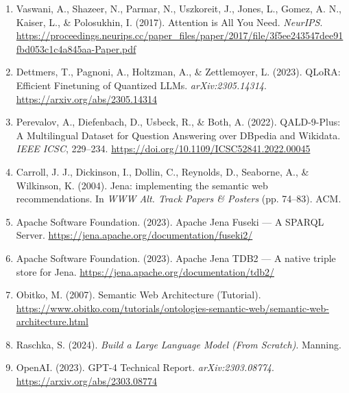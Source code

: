 \documentclass[12pt,a4paper,onecolumn]{article}
\begin{document}
\begin{enumerate}
  \item Vaswani, A., Shazeer, N., Parmar, N., Uszkoreit, J., Jones, L., Gomez, A. N., Kaiser, L., \& Polosukhin, I. (2017). Attention is All You Need. \textit{NeurIPS}. \url{https://proceedings.neurips.cc/paper_files/paper/2017/file/3f5ee243547dee91fbd053c1c4a845aa-Paper.pdf}
  \item Dettmers, T., Pagnoni, A., Holtzman, A., \& Zettlemoyer, L. (2023). QLoRA: Efficient Finetuning of Quantized LLMs. \textit{arXiv:2305.14314}. \url{https://arxiv.org/abs/2305.14314}
  \item Perevalov, A., Diefenbach, D., Usbeck, R., \& Both, A. (2022). QALD-9-Plus: A Multilingual Dataset for Question Answering over DBpedia and Wikidata. \textit{IEEE ICSC}, 229--234. \url{https://doi.org/10.1109/ICSC52841.2022.00045}
  \item Carroll, J. J., Dickinson, I., Dollin, C., Reynolds, D., Seaborne, A., \& Wilkinson, K. (2004). Jena: implementing the semantic web recommendations. In \textit{WWW Alt. Track Papers \& Posters} (pp. 74--83). ACM.
  \item Apache Software Foundation. (2023). Apache Jena Fuseki — A SPARQL Server. \url{https://jena.apache.org/documentation/fuseki2/}
  \item Apache Software Foundation. (2023). Apache Jena TDB2 — A native triple store for Jena. \url{https://jena.apache.org/documentation/tdb2/}
  \item Obitko, M. (2007). Semantic Web Architecture (Tutorial). \url{https://www.obitko.com/tutorials/ontologies-semantic-web/semantic-web-architecture.html}
  \item Raschka, S. (2024). \textit{Build a Large Language Model (From Scratch)}. Manning.
  \item OpenAI. (2023). GPT-4 Technical Report. \textit{arXiv:2303.08774}. \url{https://arxiv.org/abs/2303.08774}
\end{enumerate}
\endgroup
\end{document}
